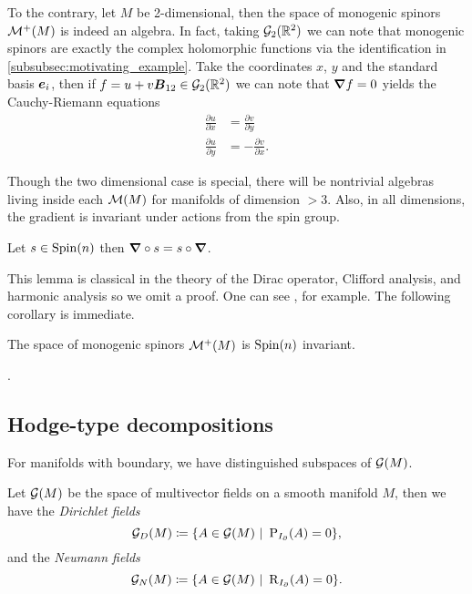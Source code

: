 To the contrary, let $M$ be 2-dimensional, then the space of monogenic spinors $\mathcal{M}^+(M)$ is indeed an algebra. In fact, taking $\mathcal{G}_2(\mathbb{R}^2)$ we can note that monogenic spinors are exactly the complex holomorphic functions via the identification in \cref{subsubsec:motivating_example}. Take the coordinates $x$, $y$ and the standard basis $\boldsymbol{e}_i$, then if $f=u+v\boldsymbol{B}_{12} \in \mathcal{G}_2(\mathbb{R}^2)$ we can note that $\boldsymbol{\nabla} f =0$ yields the Cauchy-Riemann equations
\begin{align}
\label{eq:cauchy_riemann_equations}
    \frac{\partial u}{\partial x} &= \frac{\partial v}{\partial y}\\
    \frac{\partial u}{\partial y} &= -\frac{\partial v}{\partial x}.
\end{align}

Though the two dimensional case is special, there will be nontrivial algebras living inside each $\mathcal{M}(M)$ for manifolds of dimension $>3$. Also, in all dimensions, the gradient is invariant under actions from the spin group.
\begin{lemma}
\label{lem:clifford_invariant}
Let $s\in \operatorname{Spin}(n)$ then $\boldsymbol{\nabla} \circ s = s \circ \boldsymbol{\nabla}$.
\end{lemma}
This lemma is classical in the theory of the Dirac operator, Clifford analysis, and harmonic analysis so we omit a proof.  One can see \cite{janssens_special_nodate}, for example. The following corollary is immediate.
\begin{corollary}
The space of monogenic spinors $\mathcal{M}^+(M)$ is $\operatorname{Spin}(n)$ invariant.
\end{corollary}
.



\subsection{Hodge-type decompositions}

For manifolds with boundary, we have distinguished subspaces of $\mathcal{G}(M)$. 
\begin{definition}
Let $\mathcal{G}(M)$ be the space of multivector fields on a smooth manifold $M$, then we have the \emph{Dirichlet fields}
\begin{equation}
\mathcal{G}_D(M) \coloneqq \{A \in \mathcal{G}(M) ~\vert~ \operatorname{P}_{I_{\partial}}(A) = 0 \},
\end{equation}
and the \emph{Neumann fields}
\begin{equation}
\mathcal{G}_N(M) \coloneqq \{A \in \mathcal{G}(M) ~\vert~ \operatorname{R}_{I_{\partial}}(A) = 0 \}.
\end{equation}
\end{definition}

